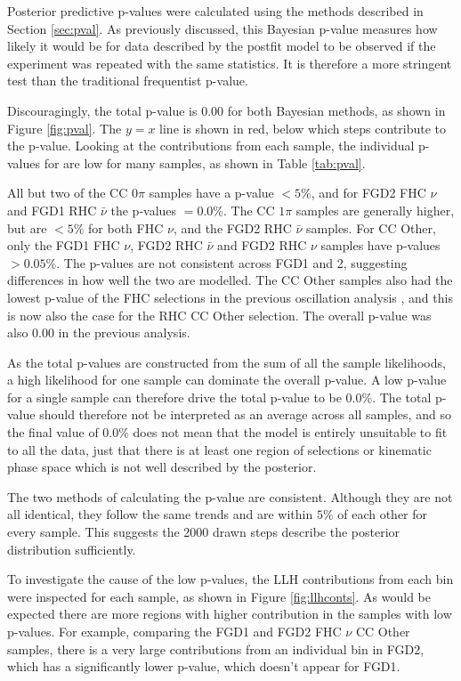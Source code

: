 Posterior predictive p-values were calculated using the methods described in Section \ref{sec:pval}. As previously discussed, this Bayesian p-value measures how likely it would be for data described by the postfit model to be observed if the experiment was repeated with the same statistics. It is therefore a more stringent test than the traditional frequentist p-value.

Discouragingly, the total p-value is 0.00 for both Bayesian methods, as shown in Figure \ref{fig:pval}. The $y=x$ line is shown in red, below which steps contribute to the p-value. Looking at the contributions from each sample, the individual p-values for are low for many samples, as shown in Table \ref{tab:pval}. 

All but two of the CC 0$\pi$ samples have a p-value $<5\%$, and for FGD2 FHC $\nu$ and FGD1 RHC $\bar{\nu}$ the p-values $=0.0\%$. The CC $1\pi$ samples are generally higher, but are $<5\%$ for both FHC $\nu$, and the FGD2 RHC $\bar{\nu}$ samples. For CC Other, only the FGD1 FHC $\nu$, FGD2 RHC $\bar{\nu}$ and FGD2 RHC $\nu$ samples have p-values $>0.05\%$. The p-values are not consistent across FGD1 and 2, suggesting differences in how well the two are modelled. The CC Other samples also had the lowest p-value of the FHC selections in the previous oscillation analysis \cite{tn324}, and this is now also the case for the RHC CC Other selection. The overall p-value was also 0.00 in the previous analysis.

As the total p-values are constructed from the sum of all the sample likelihoods, a high likelihood for one sample can dominate the overall p-value. A low p-value for a single sample can therefore drive the total p-value to be 0.0$\%$. The total p-value should therefore not be interpreted as an average across all samples, and so the final value of 0.0$\%$ does not mean that the model is entirely unsuitable to fit to all the data, just that there is at least one region of selections or kinematic phase space which is not well described by the posterior.

The two methods of calculating the p-value are consistent. Although they are not all identical, they follow the same trends and are within $5\%$ of each other for every sample. This suggests the 2000 drawn steps describe the posterior distribution sufficiently.

To investigate the cause of the low p-values, the LLH contributions from each bin were inspected for each sample, as shown in Figure \ref{fig:llhconts}. As would be expected there are more regions with higher contribution in the samples with low p-values. For example, comparing the FGD1 and FGD2 FHC $\nu$ CC Other samples, there is a very large contributions from an individual bin in FGD2, which has a significantly lower p-value, which doesn't appear for FGD1.

